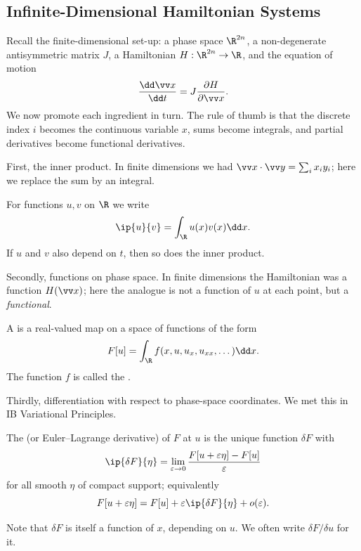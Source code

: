 \subsection{Infinite-Dimensional Hamiltonian Systems}

Recall the finite-dimensional set-up: a phase space $\R^{2n}$, a non-degenerate antisymmetric matrix $J$, a Hamiltonian $H : \R^{2n}\to\R$, and the equation of motion
$$
\frac{\dd\vv x}{\dd t} = J\frac{\partial H}{\partial \vv x}.
$$
We now promote each ingredient in turn. The rule of thumb is that the discrete index $i$ becomes the continuous variable $x$, sums become integrals, and partial derivatives become functional derivatives.

First, the inner product. In finite dimensions we had $\vv x\cdot\vv y = \sum_ix_iy_i$; here we replace the sum by an integral.

\begin{notation}
	For functions $u, v$ on $\R$ we write
	$$
	\ip{u}{v} = \int_\R u(x)v(x)\dd x.
	$$
	If $u$ and $v$ also depend on $t$, then so does the inner product.
\end{notation}

Secondly, functions on phase space. In finite dimensions the Hamiltonian was a function $H(\vv x)$; here the analogue is not a function of $u$ at each point, but a \emph{functional}.

\begin{definition}[Functional]
	A  is a real-valued map on a space of functions of the form
	$$
	F[u] = \int_\R f(x, u, u_x, u_{xx}, \dots)\dd x.
	$$
	The function $f$ is called the .
\end{definition}

Thirdly, differentiation with respect to phase-space coordinates. We met this in IB Variational Principles.

\begin{definition}
	The  (or Euler--Lagrange derivative) of $F$ at $u$ is the unique function $\delta F$ with
	$$
	\ip{\delta F}{\eta} = \lim_{\varepsilon\to0}\frac{F[u+\varepsilon\eta] - F[u]}{\varepsilon}
	$$
	for all smooth $\eta$ of compact support; equivalently
	$$
	F[u + \varepsilon\eta] = F[u] + \varepsilon\ip{\delta F}{\eta} + o(\varepsilon).
	$$
\end{definition}

Note that $\delta F$ is itself a function of $x$, depending on $u$. We often write $\delta F/\delta u$ for it.

